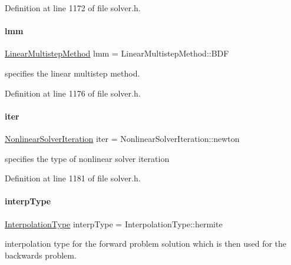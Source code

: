 Definition at line 1172 of file solver.\+h.

\mbox{\label{classamici_1_1_solver_af71d1353291520f9ba68df79c4b9f053}} 
\paragraph{\texorpdfstring{lmm}{lmm}}
{\footnotesize\ttfamily \mbox{\hyperlink{namespaceamici_a9ebe272482a8e073efe7078b7e96e8bc}{Linear\+Multistep\+Method}} lmm = Linear\+Multistep\+Method\+::\+B\+DF\hspace{0.3cm}{\ttfamily [protected]}}

specifies the linear multistep method. 

Definition at line 1176 of file solver.\+h.

\mbox{\label{classamici_1_1_solver_a0ef59d3f746d2ec0e3f126b7b9989f50}} 
\paragraph{\texorpdfstring{iter}{iter}}
{\footnotesize\ttfamily \mbox{\hyperlink{namespaceamici_a13388d34e4c35bb592c3e821c35cc923}{Nonlinear\+Solver\+Iteration}} iter = Nonlinear\+Solver\+Iteration\+::newton\hspace{0.3cm}{\ttfamily [protected]}}

specifies the type of nonlinear solver iteration 

Definition at line 1181 of file solver.\+h.

\mbox{\label{classamici_1_1_solver_a5a80193af5ca74a4a4e3da67a7e74a98}} 
\paragraph{\texorpdfstring{interpType}{interpType}}
{\footnotesize\ttfamily \mbox{\hyperlink{namespaceamici_a8472f01c511d77bbfb981a46618ea1ea}{Interpolation\+Type}} interp\+Type = Interpolation\+Type\+::hermite\hspace{0.3cm}{\ttfamily [protected]}}

interpolation type for the forward problem solution which is then used for the backwards problem. 

